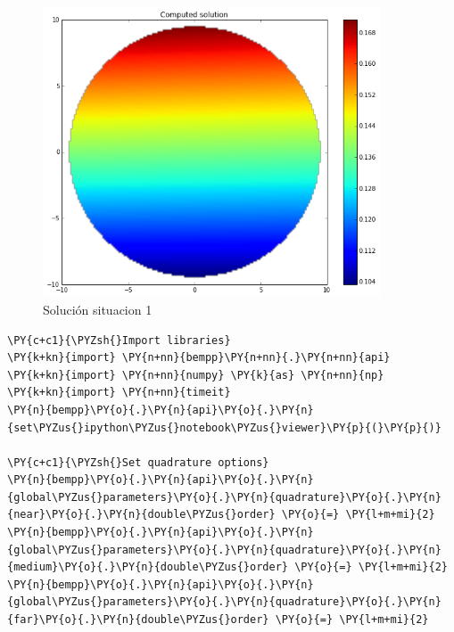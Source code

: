 \begin{figure}[H]
\centering
\includegraphics[width=10cm]{Imagenes/graficas/Situacion 1/Solucion ecuacion 1/2d.png}
\caption{Solución situacion 1}
\end{figure}

\begin{tcolorbox}
\begin{Verbatim}[commandchars=\\\{\}]
\PY{c+c1}{\PYZsh{}Import libraries}
\PY{k+kn}{import} \PY{n+nn}{bempp}\PY{n+nn}{.}\PY{n+nn}{api}
\PY{k+kn}{import} \PY{n+nn}{numpy} \PY{k}{as} \PY{n+nn}{np}
\PY{k+kn}{import} \PY{n+nn}{timeit}
\PY{n}{bempp}\PY{o}{.}\PY{n}{api}\PY{o}{.}\PY{n}{set\PYZus{}ipython\PYZus{}notebook\PYZus{}viewer}\PY{p}{(}\PY{p}{)}
        
\PY{c+c1}{\PYZsh{}Set quadrature options}
\PY{n}{bempp}\PY{o}{.}\PY{n}{api}\PY{o}{.}\PY{n}{global\PYZus{}parameters}\PY{o}{.}\PY{n}{quadrature}\PY{o}{.}\PY{n}{near}\PY{o}{.}\PY{n}{double\PYZus{}order} \PY{o}{=} \PY{l+m+mi}{2}
\PY{n}{bempp}\PY{o}{.}\PY{n}{api}\PY{o}{.}\PY{n}{global\PYZus{}parameters}\PY{o}{.}\PY{n}{quadrature}\PY{o}{.}\PY{n}{medium}\PY{o}{.}\PY{n}{double\PYZus{}order} \PY{o}{=} \PY{l+m+mi}{2}
\PY{n}{bempp}\PY{o}{.}\PY{n}{api}\PY{o}{.}\PY{n}{global\PYZus{}parameters}\PY{o}{.}\PY{n}{quadrature}\PY{o}{.}\PY{n}{far}\PY{o}{.}\PY{n}{double\PYZus{}order} \PY{o}{=} \PY{l+m+mi}{2}
\end{Verbatim}
\end{tcolorbox}

